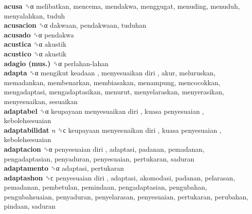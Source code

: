 \textbf{acusa} ␝α  melibatkan, mencema, mendakwa, menggugat, menuding, menuduh, menyalahkan, tuduh  \\
\textbf{acusacion} ␝α  dakwaan, pendakwaan, tuduhan  \\
\textbf{acusado} ␝α  pendakwa  \\
\textbf{acustica} ␝α  akustik  \\
\textbf{acustico} ␝α  akustik  \\
\textbf{adagio (mus.)} ␝α   perlahan-lahan   \\
\textbf{adapta} ␝α   mengikut keadaan ,  menyesuaikan diri , akur, meluruskan, memadankan, membenarkan, membiasakan, menampung, mencocokkan, mengadaptasi, mengadaptasikan, menurut, menyelaraskan, menyerasikan, menyesuaikan, sesuaikan  \\
\textbf{adaptabel} ␝α   keupayaan menyesuaikan diri ,  kuasa penyesuaian , kebolehsesuaian  \\
\textbf{adaptabilidat} \emph{n}  ␝ϲ   keupayaan menyesuaikan diri ,  kuasa penyesuaian , kebolehsesuaian  \\
\textbf{adaptacion} ␝α   penyesuaian diri , adaptasi, padanan, pemadanan, pengadaptasian, penyaduran, penyesuaian, pertukaran, saduran  \\
\textbf{adaptamento} ␝α  adaptasi, pertukaran  \\
\textbf{adaptashon} ␝ϲ   penyesuaian diri , adaptasi, akomodasi, padanan, pelarasan, pemadanan, pembetulan, pemindaan, pengadaptasian, pengubahan, pengubahsuaian, penyaduran, penyelarasan, penyesuaian, pertukaran, perubahan, pindaan, saduran  \\
